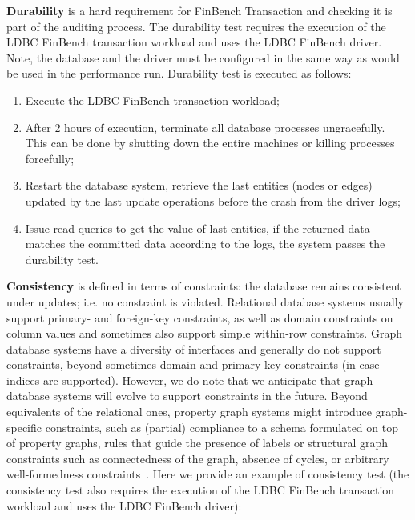 {\bf Durability} is a hard requirement for FinBench Transaction and checking it 
is part of the auditing process. The durability test requires the execution of 
the LDBC FinBench transaction workload and uses the LDBC FinBench driver. Note, 
the database and the driver must be configured in the same way as would be used 
in the performance run. Durability test is executed as follows:

\begin{enumerate}[label={(\roman*)}]
  \item Execute the LDBC FinBench transaction workload;
  \item After 2 hours of execution, terminate all database processes 
        ungracefully. This can be done by shutting down the entire machines or
        killing processes forcefully;
  \item Restart the database system, retrieve the last entities (nodes or edges)
        updated by the last update operations before the crash from the driver 
        logs;
  \item Issue read queries to get the value of last entities, if the returned 
        data matches the committed data according to the logs, the system
        passes the durability test.
\end{enumerate}

{\bf Consistency} is defined in terms of constraints: the database remains 
consistent under updates; i.e. no constraint is violated. Relational database 
systems usually support primary- and foreign-key constraints, as well as domain 
constraints on column values and sometimes also support simple within-row 
constraints. Graph database systems have a diversity of interfaces and generally
do not support constraints, beyond sometimes domain and primary key constraints 
(in case indices are supported). However, we do note that we anticipate that 
graph database systems will evolve to support constraints in the future. Beyond 
equivalents of the relational ones, property graph systems might introduce 
graph-specific constraints, such as (partial) compliance to a schema formulated 
on top of property graphs, rules that guide the presence of labels or structural
graph constraints such as connectedness of the graph, absence of cycles, or 
arbitrary well-formedness constraints~\cite{DBLP:journals/sosym/SemerathBHSV17}.
Here we provide an example of consistency test (the consistency test also 
requires the execution of the LDBC FinBench transaction workload and uses the 
LDBC FinBench driver):

